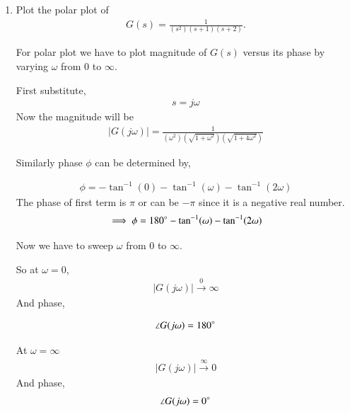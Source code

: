 \begin{enumerate}[label=\thesection.\arabic*.,ref=\thesection.\theenumi]
\item Plot the polar plot of 
\begin{align}
    G(s) = \frac{1}{(s^2)(s+1)(s+2)}. 
    \label{eq:ee18btech11028_1}
\end{align}

\solution
For polar plot we have to plot magnitude of $G(s)$ versus its phase
by varying $\omega$ from 0 to $\infty$.

First substitute, 
\begin{align}
    s = j\omega
\end{align}
Now the magnitude will be
\begin{align}
    |G(j\omega)| = \frac{1}{(\omega^2)(\sqrt{1 + \omega^2})(\sqrt{1+4\omega^2})}
    \label{eq:ee18btech11028_2}
\end{align}


Similarly phase $\phi$ can be determined by,

\begin{align}
  \phi = - \tan^{-1}(0) - \tan^{-1}(\omega) - \tan^{-1}(2\omega)
\end{align}
The phase of first term is $\pi$ or can be $-\pi$ since it is a negative real number.
\begin{align}
    \implies \phi = 180\degree - \tan^{-1}(\omega) - \tan^{-1}(2\omega)
    \label{eq:ee18btech11028_3}
\end{align}

Now we have to sweep $\omega$ from 0 to $\infty$.

So at $\omega = 0$,
\begin{align}
    |G(j \omega)| \xrightarrow{0} \infty 
    \label{eq:ee18btech11028_4}
\end{align}
And phase,

\begin{align}
    \angle {G(j \omega)} = 180 \degree
    \label{eq:ee18btech11028_5}
\end{align}

At $\omega = \infty$
\begin{align}
    |G(j \omega)| \xrightarrow{\infty} 0
\end{align}
 And phase,
\begin{align}
    \angle {G(j \omega)} = 0 \degree
\end{align}


\end{enumerate}
